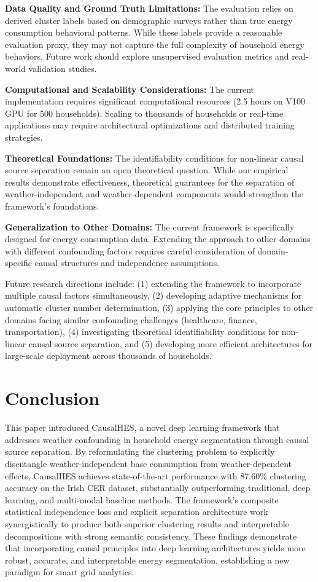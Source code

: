 \documentclass[journal]{IEEEtran}
\begin{document}
\textbf{Data Quality and Ground Truth Limitations:} The evaluation relies on derived cluster labels based on demographic surveys rather than true energy consumption behavioral patterns. While these labels provide a reasonable evaluation proxy, they may not capture the full complexity of household energy behaviors. Future work should explore unsupervised evaluation metrics and real-world validation studies.

\textbf{Computational and Scalability Considerations:} The current implementation requires significant computational resources (2.5 hours on V100 GPU for 500 households). Scaling to thousands of households or real-time applications may require architectural optimizations and distributed training strategies.

\textbf{Theoretical Foundations:} The identifiability conditions for non-linear causal source separation remain an open theoretical question. While our empirical results demonstrate effectiveness, theoretical guarantees for the separation of weather-independent and weather-dependent components would strengthen the framework's foundations.

\textbf{Generalization to Other Domains:} The current framework is specifically designed for energy consumption data. Extending the approach to other domains with different confounding factors requires careful consideration of domain-specific causal structures and independence assumptions.

Future research directions include: (1) extending the framework to incorporate multiple causal factors simultaneously, (2) developing adaptive mechanisms for automatic cluster number determination, (3) applying the core principles to other domains facing similar confounding challenges (healthcare, finance, transportation), (4) investigating theoretical identifiability conditions for non-linear causal source separation, and (5) developing more efficient architectures for large-scale deployment across thousands of households.

\section{Conclusion}
This paper introduced CausalHES, a novel deep learning framework that addresses weather confounding in household energy segmentation through causal source separation. By reformulating the clustering problem to explicitly disentangle weather-independent base consumption from weather-dependent effects, CausalHES achieves state-of-the-art performance with 87.60\% clustering accuracy on the Irish CER dataset, substantially outperforming traditional, deep learning, and multi-modal baseline methods. The framework's composite statistical independence loss and explicit separation architecture work synergistically to produce both superior clustering results and interpretable decompositions with strong semantic consistency. These findings demonstrate that incorporating causal principles into deep learning architectures yields more robust, accurate, and interpretable energy segmentation, establishing a new paradigm for smart grid analytics.



\end{document}
